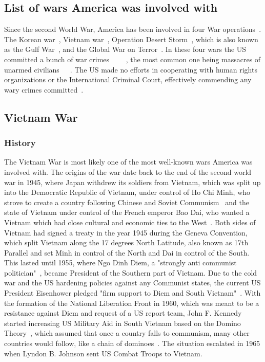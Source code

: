 \documentclass[12pt,a4paper]{article}
\begin{document}
		\subsection{List of wars America was involved with}
		Since the second World War, America has been involved in four War operations~\cite{va-gov-american-wars}.
		The Korean war~\cite{va-gov-american-wars}, Vietnam war~\cite{va-gov-american-wars}, Operation Desert Storm~\cite{va-gov-american-wars}, which is also known as the Gulf War~\cite{defense-gov-gulf}, and the Global War on Terror~\cite{va-gov-american-wars}.
		In these four wars the US committed a bunch of war crimes ~\cite{globalpolicy-iraq-warcrimes}~\cite{historynews-vietnam-warcrimes}~\cite{hrw-hr-abuses-afghanistan}~\cite{washingtonpost-korea-warcrimes}, the most common one being massacres of unarmed civilians~\cite{asiasociety-nogun-ri}~\cite{history-my-lai}~\cite{theguardian-shinwar-shooting}. The US made no efforts in cooperating with human rights organizations or the International Criminal Court, effectively commending any wary crimes committed~\cite{globaltimes-us-evade-warcrimes}.
		\subsection{Vietnam War}
		\subsubsection{History}
		The Vietnam War is most likely one of the most well-known wars America was involved with.
		The origins of the war date back to the end of the second world war in 1945, where Japan withdrew its soldiers from Vietnam, which was split up into the Democratic Republic of Vietnam, under control of Ho Chi Minh, who strove to create a country following Chinese and Soviet Communism~\cite{vietnam-war-history} and the state of Vietnam under control of the French emperor Bao Dai, who wanted a Vietnam which had close cultural and economic ties to the West~\cite{vietnam-war-history}.
		Both sides of Vietnam had signed a treaty in the year 1945 during the Geneva Convention, which split Vietnam along the 17 degrees North Latitude, also known as 17th Parallel and set Minh in control of the North and Dai in control of the South.
		This lasted until 1955, where Ngo Dinh Diem, a "strongly anti communist politician"~\cite{vietnam-war-history}, became President of the Southern part of Vietnam. Due to the cold war and the US hardening policies against any Communist states, the current US President Eisenhower pledged "firm support to Diem and South Vietnam"~\cite{vietnam-war-history}.
		With the formation of the National Liberation Front in 1960, which was meant to be a resistance against Diem and request of a US report team, John F. Kennedy started increasing US Military Aid in South Vietnam based on the Domino Theory~\cite{vietnam-war-history}, which assumed that once a country falls to communism, many other countries would follow, like a chain of dominoes~\cite{cold-war-domino-theory}.
		The situation escalated in 1965 when Lyndon B. Johnson sent US Combat Troops to Vietnam.
\end{document}
